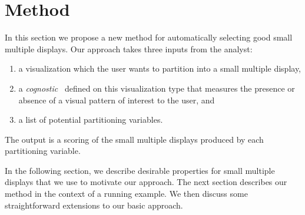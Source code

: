\section{Method}
\label{sec:method}

In this section we propose a new method for automatically selecting good small multiple displays. Our approach takes three inputs from the analyst:
\begin{enumerate}
\item a visualization which the user wants to partition into a small multiple display,
\item a \textit{cognostic}~\cite{Tukey1982,Tukey1985} defined on this visualization type that measures the presence or absence of a visual pattern of interest to the user, and
\item a list of potential partitioning variables.
\end{enumerate}
The output is a scoring of the small multiple displays produced by each partitioning variable.

In the following section, we describe desirable properties for small multiple displays that we use to motivate our approach. The next section describes our method in the context of a running example. We then discuss some straightforward extensions to our basic approach.

